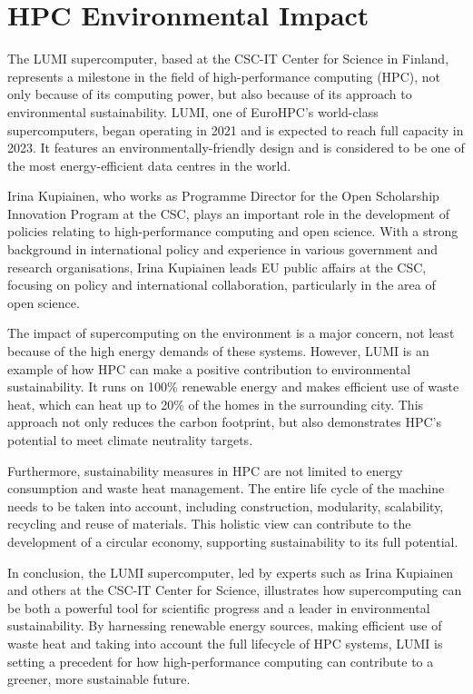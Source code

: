 \documentclass[12pt,oneside]{book} %
\begin{document}
\section{HPC Environmental Impact}
The LUMI supercomputer, based at the CSC-IT Center for Science in Finland,
represents a milestone in the field of high-performance computing (HPC), not
only because of its computing power, but also because of its approach to
environmental sustainability. LUMI, one of EuroHPC's world-class
supercomputers, began operating in 2021 and is expected to reach full capacity
in 2023. It features an environmentally-friendly design and is considered to be
one of the most energy-efficient data centres in the world.

Irina Kupiainen, who works as Programme Director for the Open Scholarship
Innovation Program at the CSC, plays an important role in the development of
policies relating to high-performance computing and open science. With a strong
background in international policy and experience in various government and
research organisations, Irina Kupiainen leads EU public affairs at the CSC,
focusing on policy and international collaboration, particularly in the area of
open science.

The impact of supercomputing on the environment is a major concern, not least
because of the high energy demands of these systems. However, LUMI is an
example of how HPC can make a positive contribution to environmental
sustainability. It runs on 100\% renewable energy and makes efficient use of
waste heat, which can heat up to 20\% of the homes in the surrounding city.
This approach not only reduces the carbon footprint, but also demonstrates
HPC's potential to meet climate neutrality targets.

Furthermore, sustainability measures in HPC are not limited to energy
consumption and waste heat management. The entire life cycle of the machine
needs to be taken into account, including construction, modularity,
scalability, recycling and reuse of materials. This holistic view can
contribute to the development of a circular economy, supporting sustainability
to its full potential.

In conclusion, the LUMI supercomputer, led by experts such as Irina Kupiainen
and others at the CSC-IT Center for Science, illustrates how supercomputing can
be both a powerful tool for scientific progress and a leader in environmental
sustainability. By harnessing renewable energy sources, making efficient use of
waste heat and taking into account the full lifecycle of HPC systems, LUMI is
setting a precedent for how high-performance computing can contribute to a
greener, more sustainable future.
\end{document}

